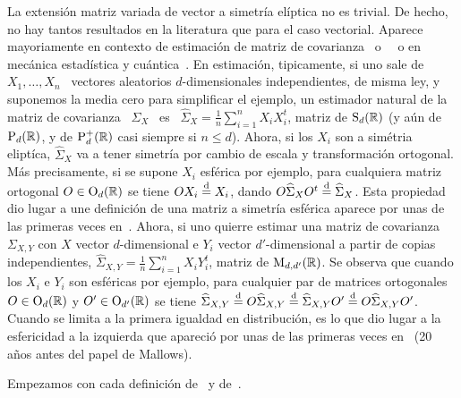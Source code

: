 
\label{Ssec:MP:FamiliaElipticaMatriz}

La  extensi\'on  matriz  variada  de   vector  a  simetr\'ia  el\'iptica  no  es
trivial. De  hecho, no hay tantos resultados  en la literatura que  para el caso
vectorial.   Aparece  mayoriamente en  contexto  de  estimaci\'on  de matriz  de
covarianza~\cite[\S.~13.2]{BilBre99}  o~\cite{Mal61,   Dem69,  Tyl82,  GruRoc90,
  GupVar94,  GupVar95, GupNag99,  FanLi99, And03,  CarGon16} \  o  en mec\'anica
estad\'istica   y  cu\'antica~\cite{Car83,   Meh04,  AndGui10,   LivNov18}.   En
estimaci\'on,  tipicamente, si  uno  sale de  \  $X_1, \ldots,  X_n$ \  vectores
aleatorios $d$-dimensionales independientes, de  misma ley, y suponemos la media
cero  para  simplificar  el  ejemplo,  un  estimador natural  de  la  matriz  de
covarianza \  $\Sigma_X$ \ es \ $\displaystyle  \widehat{\Sigma}_X = \frac{1}{n}
\sum_{i=1}^n X_i X_i^t$, matriz  de $\mathrm{S}_d(\mathbb{R})$ (y a\'un de $\mathrm{P}_d(\mathbb{R})$,
y de $\mathrm{P}_d^+(\mathbb{R})$  casi siempre si $n  \le d$).  Ahora, si los  $X_i$ son a
sim\'etria elipt\'ica, $\widehat{\Sigma}_X$ va  a tener simetr\'ia por cambio de
escala  y transformaci\'on ortogonal.   M\'as precisamente,  si se  supone $X_i$
esf\'erica por  ejemplo, para cualquiera matriz ortogonal  $O \in \mathrm{O}_d(\mathbb{R})$
se  tiene   $O  X_i  \stackrel{\mathrm{d}}{=}   X_i$,  dando  $O  \widehat{\Sigma}_X   O^t  \stackrel{\mathrm{d}}{=}
\widehat{\Sigma}_X$.  Esta propiedad dio lugar  a une definici\'on de una matriz
a simetr\'ia esf\'erica aparece por  unas de las primeras veces en~\cite{Mal61}.
Ahora, si  uno quierre estimar una  matriz de covarianza  $\Sigma_{X,Y}$ con $X$
vector  $d$-dimensional  e $Y_i$  vector  $d'$-dimensional  a  partir de  copias
independientes, $\displaystyle \widehat{\Sigma}_{X,Y} = \frac{1}{n} \sum_{i=1}^n
X_i Y_i^t$,  matriz de $\mathrm{M}_{d,d'}(\mathbb{R})$. Se  observa que cuando  los $X_i$ e
$Y_i$ son esf\'ericas por ejemplo, para cualquier par de matrices ortogonales $O
\in \mathrm{O}_d(\mathbb{R})$ y $O'  \in \mathrm{O}_{d'}(\mathbb{R})$ se tiene $\widehat{\Sigma}_{X,Y}
\stackrel{\mathrm{d}}{=}  O  \widehat{\Sigma}_{X,Y}  \stackrel{\mathrm{d}}{=}  \widehat{\Sigma}_{X,Y}  O'  \stackrel{\mathrm{d}}{=}  O
\widehat{\Sigma}_{X,Y}  O'$.   Cuando  se   limita  a  la  primera  igualdad  en
distribuci\'on,  es  lo que  dio  lugar  a la  esfericidad  a  la izquierda  que
apareci\'o por unas  de las primeras veces en~\cite{Hsu40}  (20 a\~nos antes del
papel de Mallows).

Empezamos  con cada  definici\'on  de~\cite[\S~9.3]{GupNag99} y  de~\cite{Hsu40,
  Mal61, Dem69,  Daw77, Chm80,  FraNg80, Kar81:1, Kar81, Kar89,  JenGoo81, Tyl82,
  Daw78, Daw81, FanChe84, And03}.

